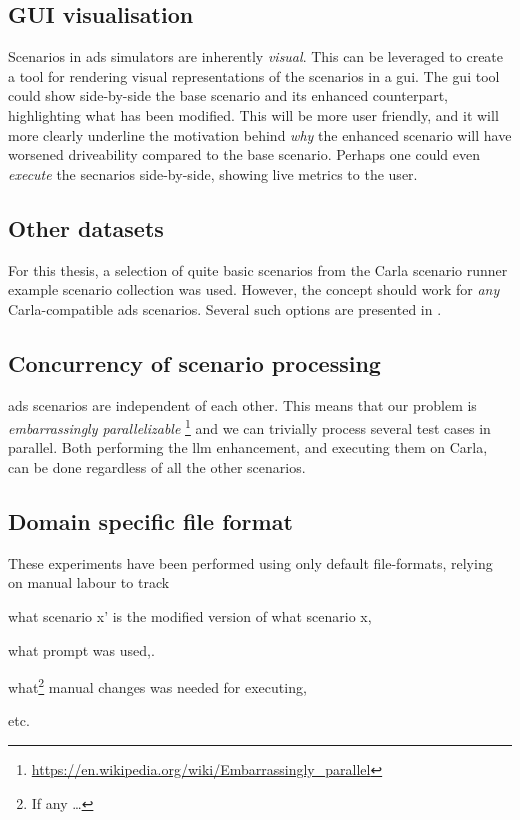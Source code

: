 \subsection{GUI visualisation}

Scenarios in \acrshort{ads} simulators are inherently \emph{visual}. This can be leveraged to create
a tool for rendering visual representations of the scenarios in a \acrfull{gui}. The \acrshort{gui}
tool could show side-by-side the base scenario and its enhanced counterpart, highlighting what has
been modified.
This will be more user friendly, and it will more clearly underline the motivation behind \emph{why}
the enhanced scenario will have worsened driveability compared to the base scenario.
Perhaps one could even \emph{execute} the secnarios side-by-side, showing live metrics to the user.

\subsection{Other datasets}

For this thesis, a selection of quite basic scenarios from the Carla scenario runner example
scenario collection was used. However, the concept should work for \emph{any} Carla-compatible
\acrshort{ads} scenarios. Several such options are presented in .

\subsection{Concurrency of scenario processing}

\acrshort{ads} scenarios are independent of each other. This means that our problem is
\textit{embarrassingly parallelizable}
\footnote{\url{https://en.wikipedia.org/wiki/Embarrassingly_parallel}} and we can trivially process
several test cases in parallel. Both performing the \acrshort{llm} enhancement, and executing them
on Carla, can be done regardless of all the other scenarios.


\subsection{Domain specific file format}

These experiments have been performed using only default file-formats, relying on manual labour to
track \begin{inparaenum}
    \item what scenario x' is the modified version of what scenario x,
    \item what prompt was used,.
    \item what\footnote{If any \ldots} manual changes was needed for executing,
\end{inparaenum} etc.


